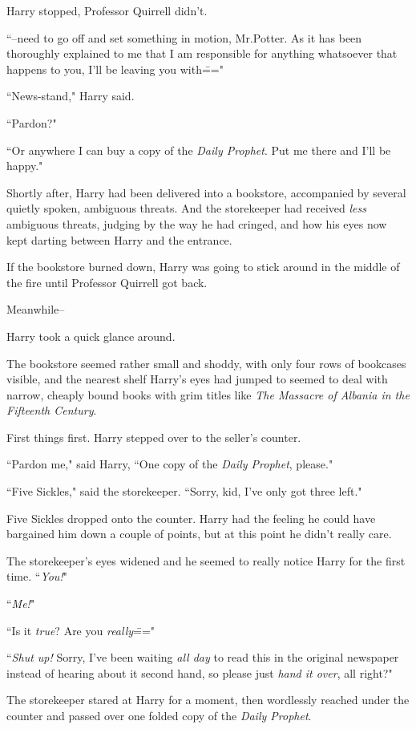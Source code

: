 Harry stopped, Professor Quirrell didn't.

``\---need to go off and set something in motion, Mr.\?Potter. As it has been thoroughly explained to me that I am responsible for anything whatsoever that happens to you, I'll be leaving you with\==="

``News-stand," Harry said.

``Pardon?"

``Or anywhere I can buy a copy of the \emph{Daily Prophet}. Put me there and I'll be happy."

Shortly after, Harry had been delivered into a bookstore, accompanied by several quietly spoken, ambiguous threats. And the storekeeper had received \emph{less} ambiguous threats, judging by the way he had cringed, and how his eyes now kept darting between Harry and the entrance.

If the bookstore burned down, Harry was going to stick around in the middle of the fire until Professor Quirrell got back.

Meanwhile\---

Harry took a quick glance around.

The bookstore seemed rather small and shoddy, with only four rows of bookcases visible, and the nearest shelf Harry's eyes had jumped to seemed to deal with narrow, cheaply bound books with grim titles like \emph{The Massacre of Albania in the Fifteenth Century}.

First things first. Harry stepped over to the seller's counter.

``Pardon me," said Harry, ``One copy of the \emph{Daily Prophet}, please."

``Five Sickles," said the storekeeper. ``Sorry, kid, I've only got three left."

Five Sickles dropped onto the counter. Harry had the feeling he could have bargained him down a couple of points, but at this point he didn't really care.

The storekeeper's eyes widened and he seemed to really notice Harry for the first time. ``\emph{You!}"

``\emph{Me!}"

``Is it \emph{true}? Are you \emph{really}\==="

``\emph{Shut up!} Sorry, I've been waiting \emph{all day} to read this in the original newspaper instead of hearing about it second hand, so please just \emph{hand it over}, all right?"

The storekeeper stared at Harry for a moment, then wordlessly reached under the counter and passed over one folded copy of the \emph{Daily Prophet}.

